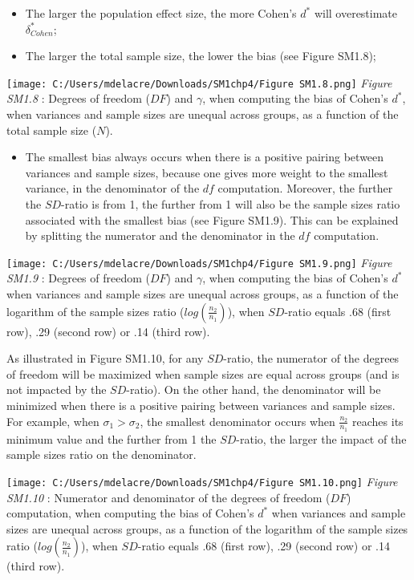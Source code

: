 \documentclass[
  english,
  man,mask,floatsintext]{apa6}
\providecommand{\tightlist}{%
  \setlength{\itemsep}{0pt}\setlength{\parskip}{0pt}}
\begin{document}
\begin{itemize}
\item
  The larger the population effect size, the more Cohen's \(d^*\) will overestimate \(\delta^*_{Cohen}\);
\item
  The larger the total sample size, the lower the bias (see Figure SM1.8);
\end{itemize}

\texttt{[image: C:/Users/mdelacre/Downloads/SM1chp4/Figure SM1.8.png]}
\emph{Figure SM1.8} : Degrees of freedom (\(DF\)) and \(\gamma\), when computing the bias of Cohen's \(d^*\), when variances and sample sizes are unequal across groups, as a function of the total sample size (\(N\)).

\begin{itemize}
\tightlist
\item
  The smallest bias always occurs when there is a positive pairing between variances and sample sizes, because one gives more weight to the smallest variance, in the denominator of the \(df\) computation. Moreover, the further the \(SD\)-ratio is from 1, the further from 1 will also be the sample sizes ratio associated with the smallest bias (see Figure SM1.9). This can be explained by splitting the numerator and the denominator in the \(df\) computation.
\end{itemize}

\texttt{[image: C:/Users/mdelacre/Downloads/SM1chp4/Figure SM1.9.png]}
\emph{Figure SM1.9} : Degrees of freedom (\(DF\)) and \(\gamma\), when computing the bias of Cohen's \(d^*\) when variances and sample sizes are unequal across groups, as a function of the logarithm of the sample sizes ratio (\(log \left( \frac{n_2}{n_1} \right)\)), when \(SD\)-ratio equals .68 (first row), .29 (second row) or .14 (third row).

As illustrated in Figure SM1.10, for any \(SD\)-ratio, the numerator of the degrees of freedom will be maximized when sample sizes are equal across groups (and is not impacted by the \(SD\)-ratio). On the other hand, the denominator will be minimized when there is a positive pairing between variances and sample sizes. For example, when \(\sigma_1 > \sigma_2\), the smallest denominator occurs when \(\frac{n_2}{n_1}\) reaches its minimum value and the further from 1 the \(SD\)-ratio, the larger the impact of the sample sizes ratio on the denominator.

\texttt{[image: C:/Users/mdelacre/Downloads/SM1chp4/Figure SM1.10.png]}
\emph{Figure SM1.10} : Numerator and denominator of the degrees of freedom (\(DF\)) computation, when computing the bias of Cohen's \(d^*\) when variances and sample sizes are unequal across groups, as a function of the logarithm of the sample sizes ratio (\(log \left( \frac{n_2}{n_1} \right)\)), when \(SD\)-ratio equals .68 (first row), .29 (second row) or .14 (third row).
\end{document}
